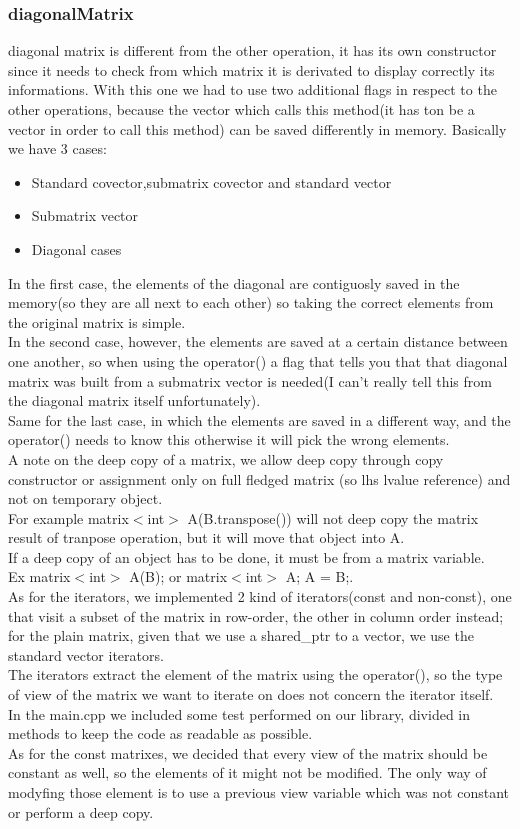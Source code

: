 \documentclass[12pt]{article}%
\begin{document}
\subsubsection{diagonalMatrix}
diagonal matrix is different from the other operation, it has its own constructor since it needs to check from which matrix it is derivated to display correctly its informations.
With this one we had to use two additional flags in respect to the other operations, because the vector which calls this method(it has ton be a vector in order to call this method) can be saved differently in memory.
Basically we have 3 cases:
\begin{itemize}
    \item Standard covector,submatrix covector and standard vector
    \item Submatrix vector
    \item Diagonal cases
\end{itemize}
In the first case, the elements of the diagonal are contiguosly saved in the memory(so they are all next to each other) so taking the correct elements from the original matrix is simple.\\
In the second case, however, the elements are saved at a certain distance between one another, so when using the operator() a flag that tells you that that diagonal matrix was built from a submatrix vector is needed(I can't really tell this from the diagonal matrix itself unfortunately).\\
Same for the last case, in which the elements are saved in a different way, and the operator() needs to know this otherwise it will pick the wrong elements.\\
A note on the deep copy of a matrix, we allow deep copy through copy constructor or assignment only on full fledged matrix (so lhs lvalue reference) and not on temporary object.\\
For example matrix$<$int$>$ A(B.transpose()) will not deep copy the matrix result of tranpose operation, but it will move that object into A.\\
If a deep copy of an object has to be done, it must be from a matrix variable. \\
Ex matrix$<$int$>$ A(B); or matrix$<$int$>$ A; A = B;.\\
As for the iterators, we implemented 2 kind of iterators(const and non-const), one that visit a subset of the matrix in row-order, the other in column order instead; for the plain matrix, given that we use a shared\_ptr to a vector, we use the standard vector iterators.\\
The iterators extract the element of the matrix using the operator(), so the type of view of the matrix we want to iterate on does not concern the iterator itself.\\
In the main.cpp we included some test performed on our library, divided in methods to keep the code as readable as possible.\\
As for the const matrixes, we decided that every view of the matrix should be constant as well, so the elements of it might not be modified. The only way of modyfing those element is to use a previous view variable which was not constant or perform a deep copy.\\
\end{document}
